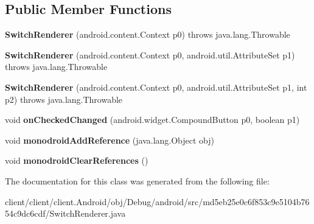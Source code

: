 \subsection*{Public Member Functions}
\begin{DoxyCompactItemize}
\item 
\hypertarget{classmd5eb25e0c6f853c9e5104b7654c9dc6cdf_1_1SwitchRenderer_ae75662d62793e4b8a5aa52da45735163}{}{\bfseries Switch\+Renderer} (android.\+content.\+Context p0)  throws java.\+lang.\+Throwable 	\label{classmd5eb25e0c6f853c9e5104b7654c9dc6cdf_1_1SwitchRenderer_ae75662d62793e4b8a5aa52da45735163}

\item 
\hypertarget{classmd5eb25e0c6f853c9e5104b7654c9dc6cdf_1_1SwitchRenderer_a2e8f262aed0ab02a49c9ba2c4ce6d06a}{}{\bfseries Switch\+Renderer} (android.\+content.\+Context p0, android.\+util.\+Attribute\+Set p1)  throws java.\+lang.\+Throwable 	\label{classmd5eb25e0c6f853c9e5104b7654c9dc6cdf_1_1SwitchRenderer_a2e8f262aed0ab02a49c9ba2c4ce6d06a}

\item 
\hypertarget{classmd5eb25e0c6f853c9e5104b7654c9dc6cdf_1_1SwitchRenderer_adebab6ebbf46dcd396479ed387273f70}{}{\bfseries Switch\+Renderer} (android.\+content.\+Context p0, android.\+util.\+Attribute\+Set p1, int p2)  throws java.\+lang.\+Throwable 	\label{classmd5eb25e0c6f853c9e5104b7654c9dc6cdf_1_1SwitchRenderer_adebab6ebbf46dcd396479ed387273f70}

\item 
\hypertarget{classmd5eb25e0c6f853c9e5104b7654c9dc6cdf_1_1SwitchRenderer_a8c3ac3be7ecfeca106e5369c7041d7e0}{}void {\bfseries on\+Checked\+Changed} (android.\+widget.\+Compound\+Button p0, boolean p1)\label{classmd5eb25e0c6f853c9e5104b7654c9dc6cdf_1_1SwitchRenderer_a8c3ac3be7ecfeca106e5369c7041d7e0}

\item 
\hypertarget{classmd5eb25e0c6f853c9e5104b7654c9dc6cdf_1_1SwitchRenderer_a0929dbbe91d5bf16ee13fb33f2dba781}{}void {\bfseries monodroid\+Add\+Reference} (java.\+lang.\+Object obj)\label{classmd5eb25e0c6f853c9e5104b7654c9dc6cdf_1_1SwitchRenderer_a0929dbbe91d5bf16ee13fb33f2dba781}

\item 
\hypertarget{classmd5eb25e0c6f853c9e5104b7654c9dc6cdf_1_1SwitchRenderer_a024596c918bebfbe6d740b9453f11b3a}{}void {\bfseries monodroid\+Clear\+References} ()\label{classmd5eb25e0c6f853c9e5104b7654c9dc6cdf_1_1SwitchRenderer_a024596c918bebfbe6d740b9453f11b3a}

\end{DoxyCompactItemize}


The documentation for this class was generated from the following file\+:\begin{DoxyCompactItemize}
\item 
client/client/client.\+Android/obj/\+Debug/android/src/md5eb25e0c6f853c9e5104b7654c9dc6cdf/Switch\+Renderer.\+java\end{DoxyCompactItemize}
